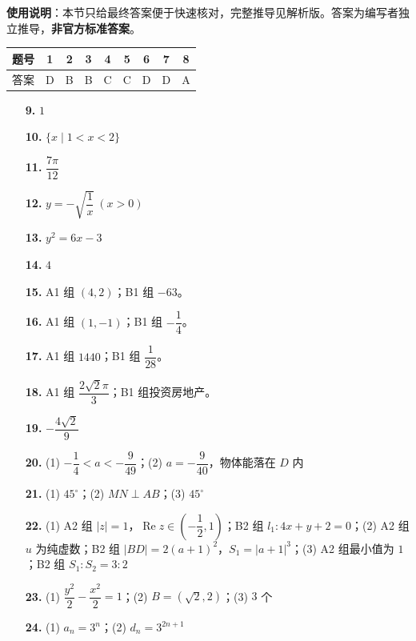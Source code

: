 
\begin{gknotice}
\textbf{使用说明}：本节只给最终答案便于快速核对，完整推导见解析版。答案为编写者独立推导，\textbf{非官方标准答案}。
\end{gknotice}

\begin{center}\begin{tabular}{ccccccccc}
\toprule
题号 & 1 & 2 & 3 & 4 & 5 & 6 & 7 & 8 \\
\midrule
答案 & D & B & B & C & C & D & D & A \\
\bottomrule
\end{tabular}\end{center}

\begin{itemize}[leftmargin=2.6em]
  \item[\textbf{9.}] $1$
  \item[\textbf{10.}] $\{x\mid 1<x<2\}$
  \item[\textbf{11.}] $\dfrac{7\pi}{12}$
  \item[\textbf{12.}] $y=-\sqrt{\dfrac1x}\ (x>0)$
  \item[\textbf{13.}] $y^2=6x-3$
  \item[\textbf{14.}] $4$
  \item[\textbf{15.}] A1 组 $(4,2)$；B1 组 $-63$。
  \item[\textbf{16.}] A1 组 $(1,-1)$；B1 组 $-\dfrac14$。
  \item[\textbf{17.}] A1 组 $1440$；B1 组 $\dfrac1{28}$。
  \item[\textbf{18.}] A1 组 $\dfrac{2\sqrt2\pi}{3}$；B1 组投资房地产。
\end{itemize}

\begin{itemize}[leftmargin=2.6em]
  \item[\textbf{19.}] $-\dfrac{4\sqrt2}{9}$
  \item[\textbf{20.}] (1) $-\dfrac14<a<-\dfrac9{49}$；(2) $a=-\dfrac9{40}$，物体能落在 $D$ 内
  \item[\textbf{21.}] (1) $45^\circ$；(2) $MN\perp AB$；(3) $45^\circ$
  \item[\textbf{22.}] (1) A2 组 $|z|=1$，$\operatorname{Re}z\in(-\dfrac12,1)$；B2 组 $l_1:4x+y+2=0$；(2) A2 组 $u$ 为纯虚数；B2 组 $|BD|=2(a+1)^2$，$S_1=|a+1|^3$；(3) A2 组最小值为 $1$；B2 组 $S_1:S_2=3:2$
  \item[\textbf{23.}] (1) $\dfrac{y^2}{2}-\dfrac{x^2}{2}=1$；(2) $B=(\sqrt2,2)$；(3) $3$ 个
  \item[\textbf{24.}] (1) $a_n=3^n$；(2) $d_n=3^{2n+1}$
\end{itemize}
